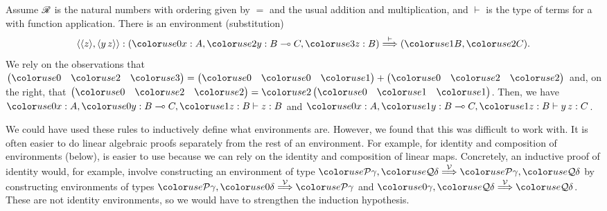 \begin{example}
  Assume $\mathscr R$ is the natural numbers with ordering given by $=$ and
  the usual addition and multiplication, and $\vdash$ is the type of
  terms for a  with function application.  There is
  an environment (substitution)
  \[
    \alr{\alr{z},\alr{y\,z}} :
    \plr{\gr0x : A, \gr2y : B \multimap C, \gr3z : B} \env\vdash
    \plr{\gr1B, \gr2C}.
  \]
  We rely on the observations that
  $\begin{pmatrix} \gr0 & \gr2 & \gr3 \end{pmatrix} =
  \begin{pmatrix} \gr0 & \gr0 & \gr1 \end{pmatrix}
  + \begin{pmatrix} \gr0 & \gr2 & \gr2 \end{pmatrix}$ and, on the right, that
  $\begin{pmatrix} \gr0 & \gr2 & \gr2 \end{pmatrix} =
  \gr2\begin{pmatrix} \gr0 & \gr1 & \gr1 \end{pmatrix}$.
  Then, we have $\gr0x : A, \gr0y : B \multimap C, \gr1z : B \vdash z : B$ and
  $\gr0x : A, \gr1y : B \multimap C, \gr1z : B \vdash y\,z : C$.
\end{example}

We could have used these rules to inductively define what environments are.
However, we found that this was difficult to work with. It is often easier to do
linear algebraic proofs separately from the rest of an environment.
For example, for identity and composition of environments (below), 
is easier to use because we can rely on the identity and composition of linear
maps.
Concretely, an inductive proof of identity would, for example, involve
constructing an environment of type
$\grP\gamma, \grQ\delta \env\V \grP\gamma, \grQ\delta$ by constructing
environments of types $\grP\gamma, \gr0\delta \env\V \grP\gamma$ and
$\gr0\gamma, \grQ\delta \env\V \grQ\delta$.
These are not identity environments, so we would have to strengthen the
induction hypothesis.


